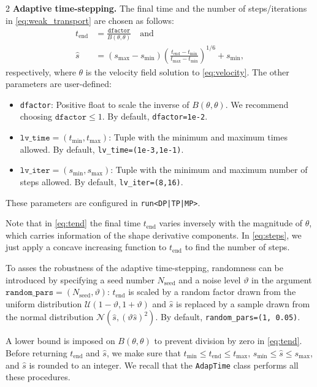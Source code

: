 \documentclass[a4paper, oneside]{article}
\newcommand{\code}[1]{\texttt{#1}}
\begin{document}
\begin{multicols}{2}
\vspace*{0.5cm}
\noindent\textbf{Adaptive time-stepping.} 
The final time and the number of steps/iterations in \eqref{eq:weak_transport}
are chosen as follows:
\begin{align}
    t_{\text{end}}  & = \tfrac{\code{dfactor}}{B(\theta, \theta)}\quad\text{and} \label{eq:tend} \\
    \hat{s} & =
	(s_{\max} - s_{\min}) \left( \tfrac{t_{\text{end}} - t_{\min}}{t_{\max} - t_{\min}} \right)^{1/6}
	+ s_{\min}, \label{eq:steps}
\end{align}
respectively, where
$\theta$ is the velocity field solution to \eqref{eq:velocity}.
The other parameters are user-defined:
\begin{itemize}[left=0.0em]
	\item \code{dfactor}:
	Positive float to scale the inverse of $B(\theta, \theta)$.
	We recommend choosing $\code{dfactor}\leq1$.
	By default, \code{dfactor=1e-2}.
	\item $\code{lv\_time} = (t_{\min}, t_{\max})$:
	Tuple with the minimum and maximum times allowed.
	By default, \code{lv\_time=(1e-3,1e-1)}.
	\item $\code{lv\_iter} = (s_{\min}, s_{\max})$:
	Tuple with the minimum and maximum number of steps allowed.
	By default, \code{lv\_iter=(8,16)}.
\end{itemize}
These parameters are configured in \code{run<DP|TP|MP>}.

Note that in \eqref{eq:tend} the final time $t_{\text{end}}$
varies inversely with the magnitude of $\theta$,
which carries information of the shape derivative components.
In \eqref{eq:steps}, we just apply a concave increasing function
to $t_{\text{end}}$ to find the number of steps.

To asses the robustness of the adaptive time-stepping,
randomness can be introduced by specifying
a seed number $N_\mathrm{seed}$ and a noise level $\vartheta$ in the argument
$\code{random\_pars} = (N_\mathrm{seed}, \vartheta)$:
$t_{\text{end}}$ is scaled by a random factor drawn from the uniform distribution
$\mathcal{U}(1 - \vartheta, 1 + \vartheta)$
and $\hat{s}$ is replaced by a sample drawn from the normal distribution
$\mathcal{N}(\hat{s}, (\vartheta \hat{s})^2)$.
By default, \code{random\_pars=(1, 0.05)}.

A lower bound is imposed on $B(\theta, \theta)$
to prevent division by zero in \eqref{eq:tend}.
Before returning $t_{\text{end}}$ and $\hat{s}$, we make sure that
$t_{\min}\leq t_{\text{end}} \leq t_{\max}$, $s_{\min}\leq \hat{s} \leq s_{\max}$,
and $\hat{s}$ is rounded to an integer.
We recall that the \code{AdapTime} class 
performs all these procedures.


\end{multicols}
\end{document}
